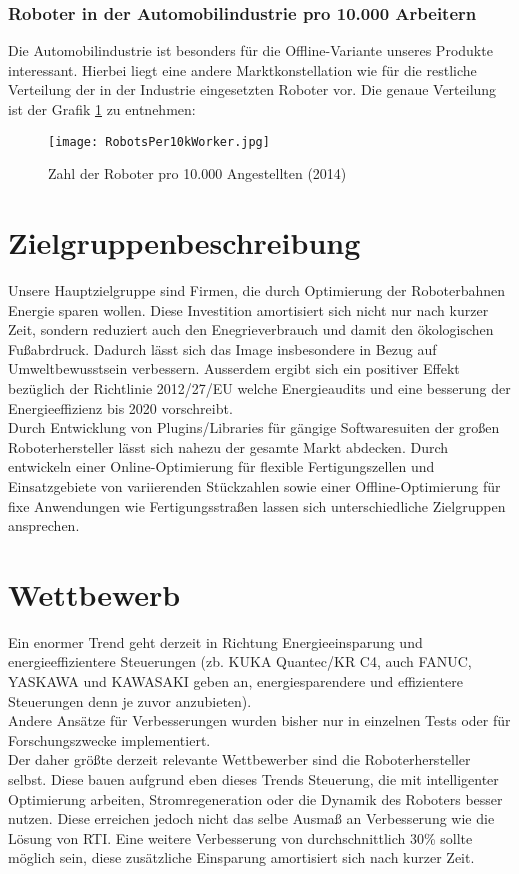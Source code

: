 \subsubsection{Roboter in der Automobilindustrie pro 10.000 Arbeitern}
Die Automobilindustrie ist besonders für die Offline-Variante unseres Produkte interessant. Hierbei liegt eine andere Marktkonstellation wie für die restliche Verteilung der in der Industrie eingesetzten Roboter vor. Die genaue Verteilung ist der Grafik \ref{fig:RobotsPer10kWorker} zu entnehmen:
\begin{figure}[h]
	\centering
	\texttt{[image: RobotsPer10kWorker.jpg]}
	\caption{Zahl der Roboter pro 10.000 Angestellten (2014)}
	\label{fig:RobotsPer10kWorker}
\end{figure}

\section{Zielgruppenbeschreibung}
Unsere Hauptzielgruppe sind Firmen, die durch Optimierung der Roboterbahnen Energie sparen wollen. Diese Investition amortisiert sich nicht nur nach kurzer Zeit, sondern reduziert auch den Enegrieverbrauch und damit den ökologischen Fußabrdruck. Dadurch lässt sich das Image insbesondere in Bezug auf Umweltbewusstsein verbessern. Ausserdem ergibt sich ein positiver Effekt bezüglich der Richtlinie 2012/27/EU welche Energieaudits und eine besserung der Energieeffizienz bis 2020 vorschreibt.\\
Durch Entwicklung von Plugins/Libraries für gängige Softwaresuiten der großen Roboterhersteller lässt sich nahezu der gesamte Markt abdecken. Durch entwickeln einer Online-Optimierung für flexible Fertigungszellen und Einsatzgebiete von variierenden Stückzahlen sowie einer Offline-Optimierung für fixe Anwendungen wie Fertigungsstraßen lassen sich unterschiedliche Zielgruppen ansprechen. 

\section{Wettbewerb}
Ein enormer Trend geht derzeit in Richtung Energieeinsparung und energieeffizientere Steuerungen (zb. KUKA Quantec/KR C4, auch FANUC, YASKAWA und KAWASAKI geben an, energiesparendere und effizientere Steuerungen denn je zuvor anzubieten).\\
Andere Ansätze für Verbesserungen wurden bisher nur in einzelnen Tests oder für Forschungszwecke implementiert.\\
Der daher größte derzeit relevante Wettbewerber sind die Roboterhersteller selbst. Diese bauen aufgrund eben dieses Trends Steuerung, die mit intelligenter Optimierung arbeiten, Stromregeneration oder die Dynamik des Roboters besser nutzen. Diese erreichen jedoch nicht das selbe Ausmaß an Verbesserung wie die Lösung von RTI. Eine weitere Verbesserung von durchschnittlich $30$\% sollte möglich sein, diese zusätzliche Einsparung amortisiert sich nach kurzer Zeit.

